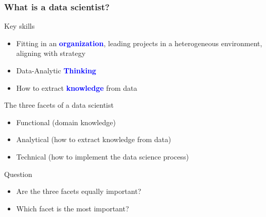 \documentclass[11pt,xcolor=svgnames]{beamer}
\begin{document}
\begin{frame}\frametitle{What is a data scientist?}
  \begin{block}{Key skills}
    \begin{itemize}
    \item Fitting in an \textcolor{blue}{\bf organization}, leading projects in a
      heterogeneous environment, aligning with strategy 
    \item Data-Analytic \textcolor{blue}{\bf Thinking}
    \item How to extract \textcolor{blue}{\bf knowledge} from data
    \end{itemize}
  \end{block}
  
  \begin{exampleblock}{The three facets of a data scientist}
    \begin{itemize}
    \item Functional (domain knowledge)
    \item Analytical (how to extract knowledge from data)
    \item Technical (how to implement the data science process)
    \end{itemize}
  \end{exampleblock}

  \pause

  \begin{alertblock}{Question}
    \begin{itemize}
    \item Are the three facets equally important? 
    \item Which facet is the most important?
    \end{itemize}
  \end{alertblock}
  
\end{frame} 
\end{document}
